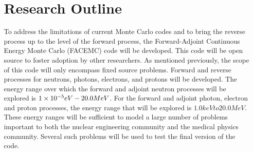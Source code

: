 \section{Research Outline}
\label{sec:research_outline}
To address the limitations of current Monte Carlo codes and to bring the reverse
process up to the level of the forward process, the Forward-Adjoint Continuous 
Energy Monte Carlo (FACEMC) code will be developed. This code will be open 
source to foster adoption by other researchers. As mentioned previously, the
scope of this code will only encompass fixed source problems. Forward and
reverse processes for neutrons, photons, electrons, and protons will be 
developed. The energy range over which the forward and adjoint neutron 
processes will be explored is $1\times 10^{-5} eV - 20.0 MeV$. For the forward and 
adjoint photon, electron and proton processes, the energy range that will be 
explored is $1.0 keV to 20.0 MeV$. These energy ranges will be sufficient to 
model a large number of problems important to both the nuclear engineering 
community and the medical physics community. Several such problems will be used
to test the final version of the code. 


